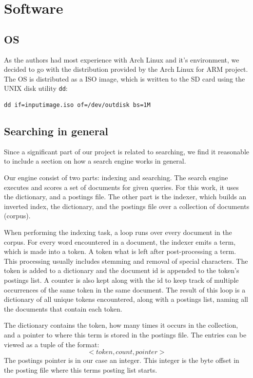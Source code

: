 \clearpage
\section{Software}
\label{sec:software}

\subsection{OS}
As the authors had most experience with Arch Linux and it's environment, we decided to go with the distribution provided by the Arch Linux for ARM project.
The OS is distributed as a ISO image, which is written to the SD card using the UNIX disk utility {\tt dd}:
\begin{lstlisting}
dd if=inputimage.iso of=/dev/outdisk bs=1M
\end{lstlisting}

\subsection{Searching in general}
Since a significant part of our project is related to searching, we find it reasonable to include a section on how a search engine works in general. 

Our engine consist of two parts: indexing and searching. 
The search engine executes and scores a set of documents for given queries. For this work, it uses the dictionary, and a postings file.
The other part is the indexer, which builds an inverted index, the dictionary, and the postings file\cite{IntroIR} over a collection of documents (corpus).

When performing the indexing task, a loop runs over every document in the corpus. 
For every word encountered in a document, the indexer emits a term, which is made into a token. 
A token what is left after post-processing a term. This processing usually includes stemming and removal of special characters. 
The token is added to a dictionary and the document id is appended to the token's postings list. A counter is also kept along with the id to keep track of multiple occurrences of the same token in the same document.
The result of this loop is a dictionary of all unique tokens encountered, along with a postings list, naming all the documents that contain each token.

The dictionary contains the token, how many times it occurs in the collection, and a pointer to where this term is stored in the postings file.
The entries can be viewed as a tuple of the format:
$$<token, count, pointer>$$
The postings pointer is in our case an integer. This integer is the byte offset in the posting file where this terms posting list starts.

